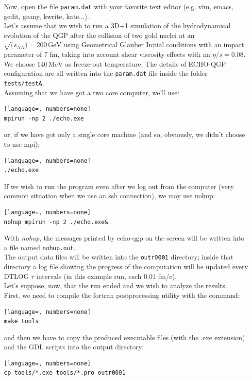 Now, open the file {\tt param.dat} with your favorite text editor (e.g. vim, emacs, gedit, geany, kwrite, kate...).\\
Let's assume that we wish to run a 3D+1 simulation of the hydrodynamical evolution of the QGP after the collision of two gold nuclei at an $\sqrt(s_{NN})=200\,\mathrm{GeV}$ using Geometrical Glauber Initial conditions with an impact parameter of $7$ fm, taking into account shear viscosity effects with an $\eta/s=0.08$.\\ We choose $140\,\mathrm{MeV}$ as freeze-out temperature. The details of ECHO-QGP configuration are all written into the {\tt param.dat} file inside the folder {\tt tests/testA}.\\
Assuming that we have got a two core computer, we'll use:
\begin{lstlisting}[language=, numbers=none]
mpirun -np 2 ./echo.exe
\end{lstlisting}
or, if we have got only a single core machine (and so, obviously, we didn't choose to use mpi):
\begin{lstlisting}[language=, numbers=none]
./echo.exe
\end{lstlisting}
If we wish to run the program even after we log out from the computer (very common situation when we use an ssh connection), we may use nohup:
\begin{lstlisting}[language=, numbers=none]
nohup mpirun -np 2 ./echo.exe&
\end{lstlisting}
With \emph{nohup}, the messages printed by echo-qgp on the screen will be written into a file named {\tt nohup.out}.\\
The output data files will be written into the {\tt outr0001} directory; inside that directory a log file showing the progress of the computation will be updated every DTLOG $\tau$ intervals (in this example run, each 0.01 fm/c).\\
Let's suppose, now, that the run ended and we wish to analyze the results.\\
First, we need to compile the fortran postprocessing utility with the command:
\begin{lstlisting}[language=, numbers=none]
make tools
\end{lstlisting}
and then we have to copy the produced executable files (with the .exe extension) and the GDL scripts into the output directory:
\begin{lstlisting}[language=, numbers=none]
cp tools/*.exe tools/*.pro outr0001
\end{lstlisting}
